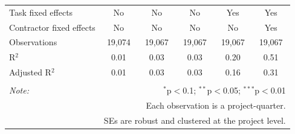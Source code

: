 \documentclass[
]{article}
\begin{document}
\begin{table}[H]
\begin{tabular}{@{\extracolsep{-2pt}}lccccc}
Task fixed effects & No & No & No & Yes & Yes \\ 
Contractor fixed effects & No & No & No & No & Yes \\ 
Observations & 19,074 & 19,067 & 19,067 & 19,067 & 19,067 \\ 
R$^{2}$ & 0.01 & 0.03 & 0.03 & 0.20 & 0.51 \\ 
Adjusted R$^{2}$ & 0.01 & 0.03 & 0.03 & 0.16 & 0.31 \\ 
\hline 
\hline \\[-1.8ex] 
\textit{Note:}  & \multicolumn{5}{r}{$^{*}$p$<$0.1; $^{**}$p$<$0.05; $^{***}$p$<$0.01} \\ 
 & \multicolumn{5}{r}{Each observation is a project-quarter.} \\ 
 & \multicolumn{5}{r}{SEs are robust and clustered at the project level.} \\ 
\end{tabular} 
\end{table}
\end{document}
